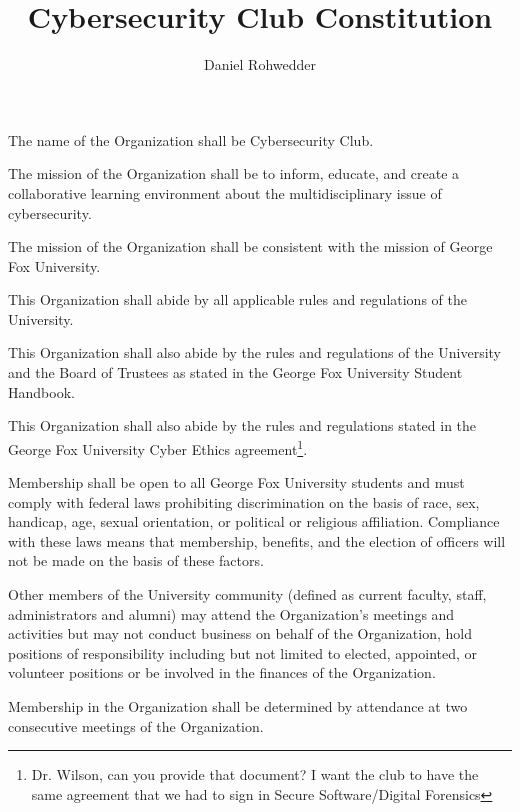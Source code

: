 \documentclass[12pt]{constitution}
\begin{document}
\title{Cybersecurity Club Constitution}
\author{Daniel Rohwedder}
\date{}
\maketitle
\tableofcontents
{}

The name of the Organization shall be Cybersecurity Club.


The mission of the Organization shall be to inform, educate, and create a collaborative learning environment about the multidisciplinary issue of cybersecurity.

The mission of the Organization shall be consistent with the mission of George Fox University.

This Organization shall abide by all applicable rules and regulations of the University.

This Organization shall also abide by the rules and regulations of the University and the Board of Trustees as stated in the George Fox University Student Handbook.

This Organization shall also abide by the rules and regulations stated in the George Fox University Cyber Ethics agreement\footnote{Dr. Wilson, can you provide that document? I want the club to have the same agreement that we had to sign in Secure Software/Digital Forensics}.


Membership shall be open to all George Fox University students and must comply with federal laws prohibiting discrimination on the basis of race, sex, handicap, age, sexual orientation, or political or religious affiliation. 
 Compliance with these laws means that membership, benefits, and the election of officers will not be made on the basis of these factors.

Other members of the University community (defined as current faculty, staff, administrators and alumni) may attend the Organization’s meetings and activities but may not conduct business on behalf of the Organization, hold positions of responsibility including but not limited to elected, appointed, or volunteer positions or be involved in the finances of the Organization.

Membership in the Organization shall be determined by attendance at two consecutive meetings of the Organization.

\end{document}
